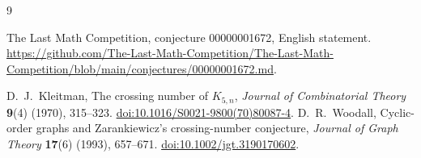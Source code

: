 \documentclass[11pt]{article}
\begin{document}
\begin{thebibliography}{9}
{\raggedright
The Last Math Competition, conjecture 00000001672, English statement.
\url{https://github.com/The-Last-Math-Competition/The-Last-Math-Competition/blob/main/conjectures/00000001672.md}.\par}
D.~J.~Kleitman, The crossing number of $K_{5,n}$,
\emph{Journal of Combinatorial Theory} \textbf{9}(4) (1970), 315--323.
\href{https://doi.org/10.1016/S0021-9800(70)80087-4}
{doi:10.1016/S0021-9800(70)80087-4}.
D.~R.~Woodall, Cyclic-order graphs and Zarankiewicz's crossing-number
conjecture, \emph{Journal of Graph Theory} \textbf{17}(6) (1993), 657--671.
\href{https://doi.org/10.1002/jgt.3190170602}
{doi:10.1002/jgt.3190170602}.
\end{thebibliography}
\end{document}
